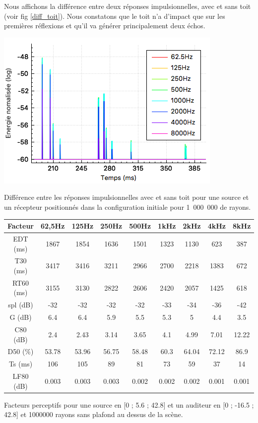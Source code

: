 %
Nous affichons la différence entre deux réponses impulsionnelles, avec et sans toit (voir fig \ref{diff_toit}). Nous constatons que le toit n'a d'impact que sur les premières réflexions et qu'il va générer principalement deux échos.
%
\begin{figureth}
	\includegraphics[width=0.6\linewidth]{images/diff_toit}
	\caption{Différence entre les réponses impulsionnelles avec et sans toit pour une source et un récepteur positionnés dans la configuration initiale pour 1~000~000 de rayons.}
	\label{diff_toit}
\end{figureth}
%
\begin{tableth}
 \begin{tabular}{| *{9}{c|}} 
 \hline 
 Facteur & 62,5Hz & 125Hz & 250Hz & 500Hz & 1kHz & 2kHz & 4kHz & 8kHz \\ 
 \hline 
 \hline 
\gls{EDT} (ms)& 1867& 1854& 1636& 1501& 1323& 1130& 623& 387 \\ 
 \hline 
\gls{T30} (ms)& 3417& 3416& 3211& 2966& 2700& 2218& 1383& 672 \\ 
 \hline 
\gls{RT60} (ms)& 3155& 3130& 2822& 2606& 2420& 2057& 1425& 618 \\ 
 \hline 
\gls{spl} (dB)& -32& -32& -32& -32& -33& -34& -36& -42 \\ 
 \hline 
\gls{G} (dB)& 6.4& 6.4& 5.9& 5.5& 5.3& 5& 4.4& 3.5 \\ 
 \hline 
\gls{C80} (dB)& 2.4& 2.43& 3.14& 3.65& 4.1& 4.99& 7.01& 12.22 \\ 
 \hline 
\gls{D50} (\%)& 53.78& 53.96& 56.75& 58.48& 60.3& 64.04& 72.12& 86.9 \\ 
 \hline 
\gls{Ts} (ms)& 106& 105& 89& 81& 73& 59& 37& 14 \\ 
 \hline 
\gls{LF80} (dB)& 0.003& 0.003& 0.003& 0.002& 0.002& 0.002& 0.001& 0.001 \\ 
 \hline 
\end{tabular} 
 \caption{Facteurs perceptifs pour une source en [0 ; 5.6 ; 42.8] et un auditeur en [0 ; -16.5 ; 42.8] et 1000000 rayons sans plafond au dessus de la scène.}
 \label{tab_fact_sansToit} 
 \end{tableth}
 
